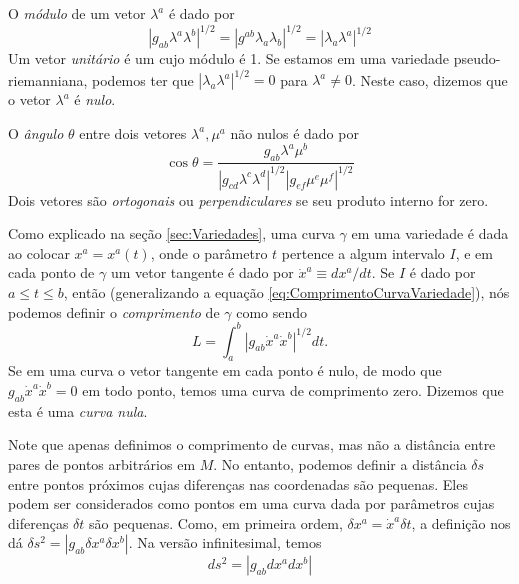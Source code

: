 O \textit{módulo} de um vetor $\lambda^a$ é dado por
\begin{equation}\label{eq:ModuloVetorVariedade}
	\left|g_{a b} \lambda^{a} \lambda^{b}\right|^{1 / 2}=\left|g^{a b} \lambda_{a} \lambda_{b}\right|^{1 / 2}=\left|\lambda_{a} \lambda^{a}\right|^{1 / 2}
\end{equation}
Um vetor \textit{unitário} é um cujo módulo é 1. Se estamos em uma variedade pseudo-riemanniana, podemos ter que $|\lambda_a\lambda^a|^{1/2}=0$ para $\lambda^a\neq0$. Neste caso, dizemos que o vetor $\lambda^a$ é \textit{nulo}.

O \textit{ângulo} $\theta$ entre dois vetores $\lambda^a,\mu^a$ não nulos é dado por
\[
	\cos \theta=\frac{g_{a b} \lambda^{a} \mu^{b}}{\left|g_{c d} \lambda^{c} \lambda^{d}\right|^{1 / 2}\left|g_{e f} \mu^{e} \mu^{f}\right|^{1 / 2}}
\]
Dois vetores são \textit{ortogonais} ou \textit{perpendiculares} se seu produto interno for zero.

Como explicado na seção \ref{sec:Variedades}, uma curva $\gamma$ em uma variedade é dada ao colocar $x^a=x^a(t)$, onde o parâmetro $t$ pertence a algum intervalo $I$, e em cada ponto de $\gamma$ um vetor tangente é dado por $\dot{x}^a\equiv dx^a/dt$. Se $I$ é dado por $a\leq t\leq b$, então (generalizando a equação \eqref{eq:ComprimentoCurvaVariedade}), nós podemos definir o \textit{comprimento} de $\gamma$ como sendo
\begin{equation}\label{eq:ComprimentoCurvaVariedade}
	\boxed{
	L = \int_a^b |g_{ab}\dot{x}^a\dot{x}^b|^{1/2}dt .
	}
\end{equation}
Se em uma curva o vetor tangente em cada ponto é nulo, de modo que $g_{ab}\dot{x}^a\dot{x}^b=0$ em todo ponto, temos uma curva de comprimento zero. Dizemos que esta é uma \textit{curva nula}.

Note que apenas definimos o comprimento de curvas, mas não a distância entre pares de pontos arbitrários em $M$. No entanto, podemos definir a distância $\delta s$ entre pontos próximos cujas diferenças nas coordenadas são pequenas. Eles podem ser considerados como pontos em uma curva dada por parâmetros cujas diferenças $\delta t$ são pequenas. Como, em primeira ordem, $\delta x^a= \dot{x}^a \delta t$, a definição nos dá $\delta s^2 = |g_{ab}\delta x^a\delta x^b|$. Na versão infinitesimal, temos
\begin{equation}\label{eq:ElementoDeLinhaVariedade}
	ds^2 = |g_{ab}dx^adx^b|
\end{equation}

